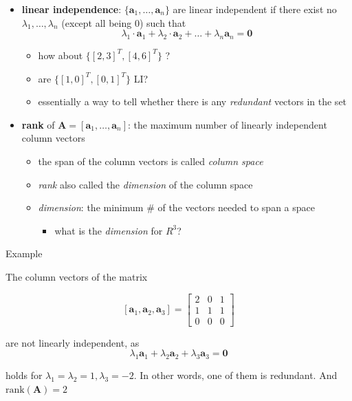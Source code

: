 \documentclass[ignorenonframetext,]{beamer}
\providecommand{\tightlist}{%
  \setlength{\itemsep}{0pt}\setlength{\parskip}{0pt}}
\newcommand{\vv}[1]{\boldsymbol{#1}}
\begin{document}
\begin{frame}{}
\protect\hypertarget{section-3}{}

\begin{itemize}
\item
  \textbf{linear independence}: \(\{\vv{a}_1, \ldots, \vv{a}_n\}\) are
  linear independent if there exist no \(\lambda_1, \ldots, \lambda_n\)
  (except all being 0) such that
  \[\lambda_1\cdot \vv{a}_1 + \lambda_2 \cdot \vv{a}_2+\ldots + \lambda_n\vv{a}_n=\vv{0}\]

  \begin{itemize}
  \tightlist
  \item
    how about \(\{[2,3]^T, [4,6]^T\}\) ?
  \item
    are \(\{[1,0]^T, [0,1]^T\}\) LI?
  \item
    essentially a way to tell whether there is any \emph{redundant}
    vectors in the set
  \end{itemize}
\item
  \textbf{rank} of \(\vv{A} = [\vv{a}_1, \ldots, \vv{a}_n]\): the
  maximum number of linearly independent column vectors

  \begin{itemize}
  \tightlist
  \item
    the span of the column vectors is called \emph{column space}
  \item
    \emph{rank} also called the \emph{dimension} of the column space
  \item
    \emph{dimension}: the minimum \(\#\) of the vectors needed to span a
    space

    \begin{itemize}
    \tightlist
    \item
      what is the \emph{dimension} for \(R^3\)?
    \end{itemize}
  \end{itemize}
\end{itemize}

\end{frame}

\begin{frame}{Example}
\protect\hypertarget{example-2}{}

The column vectors of the matrix

\[[\vv{a}_1, \vv{a}_2, \vv{a}_3]= \begin{bmatrix} 2 &0 & 1 \\
1&1& 1 \\
0 &0&0
\end{bmatrix}\]

are not linearly independent, as
\[\lambda_1 \vv{a}_1 +\lambda_2\vv{a}_2+\lambda_3\vv{a}_3 = \vv{0}\]

holds for \(\lambda_1=\lambda_2=1, \lambda_3=-2\). In other words, one
of them is redundant. And \(\text{rank}(\vv{A}) = 2\)

\end{frame}
\end{document}
